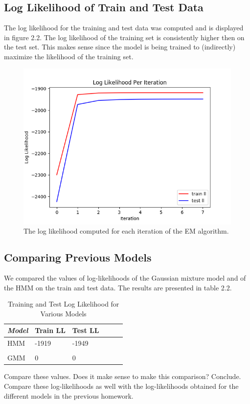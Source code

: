 \documentclass[paper=a4, fontsize=11pt]{scrartcl} %
\numberwithin{equation}{section} %
\numberwithin{figure}{section} %
\numberwithin{table}{section} %
\begin{document}
\subsection{Log Likelihood of Train and Test Data}

The log likelihood for the training and test data was computed and is displayed in figure 2.2. The log likelihood of the training set is consistently higher then on the test set. This makes sense since the model is being trained to (indirectly) maximize the likelihood of the training set.

\begin{figure}
	\includegraphics[width=.9\linewidth]{ll_Plot.png}
	\caption{The log likelihood computed for each iteration of the EM algorithm.}
\end{figure}

\newpage

\subsection{Comparing Previous Models}
We compared the values of log-likelihoods of the Gaussian mixture
model and of the HMM on the train and test data. The results are presented in table 2.2.

	\begin{table}
		\caption {Training and Test Log Likelihood for Various Models} \label{tab:title} 
		\begin{center}		
			\begin{tabular}{*6l}   
				\toprule
				\emph{Model}&  Train LL & Test LL  \\\midrule
				HMM & -1919 & -1949	\\ \\
				GMM & 0 & 0	
				\\\bottomrule
				\hline
			\end{tabular}
		\end{center}
	\end{table}

Compare these values. Does it make sense to make this comparison? Conclude. Compare these log-likelihoods as well with
the log-likelihoods obtained for the different models in the previous homework.
\end{document}
